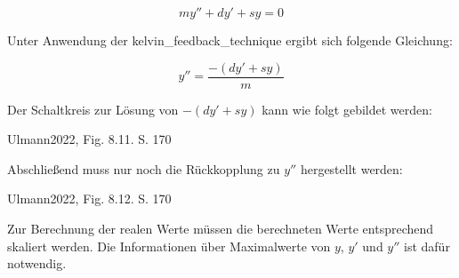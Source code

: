 \[my''+dy'+sy=0\]

Unter Anwendung der \gls{kelvin_feedback_technique} ergibt sich folgende Gleichung:

\[y''=\frac{-(dy'+sy)}{m}\]

Der Schaltkreis zur Lösung von \(-(dy'+sy)\) kann wie folgt gebildet werden:

Ulmann2022, Fig. 8.11. S. 170

Abschließend muss nur noch die Rückkopplung zu \(y''\) hergestellt werden:

Ulmann2022, Fig. 8.12. S. 170

Zur Berechnung der realen Werte müssen die berechneten Werte entsprechend skaliert werden. Die Informationen über Maximalwerte von \(y\), \(y'\) und \(y''\) ist dafür notwendig.
